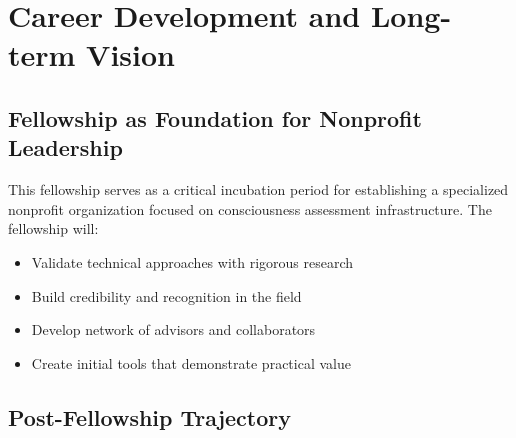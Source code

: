 \documentclass[11pt,a4paper]{article}
\begin{document}
\section{Career Development and Long-term Vision}
\label{sec:career}





\subsection{Fellowship as Foundation for Nonprofit Leadership}

This fellowship serves as a critical incubation period for establishing a specialized nonprofit organization focused on consciousness assessment infrastructure. The fellowship will:

\begin{itemize}
    \item Validate technical approaches with rigorous research
    \item Build credibility and recognition in the field
    \item Develop network of advisors and collaborators
    \item Create initial tools that demonstrate practical value
\end{itemize}

\subsection{Post-Fellowship Trajectory}
\end{document}
